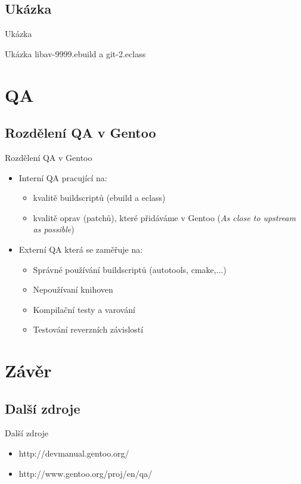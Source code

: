 \documentclass{beamer}
\begin{document}
\subsection{Ukázka}
\begin{frame}{Ukázka}
	\begin{center}Ukázka libav-9999.ebuild a git-2.eclass\end{center}
\end{frame}
\section{QA}

\subsection{Rozdělení QA v Gentoo}
\begin{frame}{Rozdělení QA v Gentoo}
	\begin{itemize}
	\item Interní QA pracující na:
		\begin{itemize}
			\item kvalitě buildscriptů (ebuild a eclass)
			\item kvalitě oprav (patchů), které přidáváme v Gentoo ({\it As close to upstream as possible})
		\end{itemize}
	\item Externí QA která se zaměřuje na:
		\begin{itemize}
			\item Správné používání buildscriptů (autotools, cmake,...)
			\item Nepoužívaní  knihoven
			\item Kompilační testy a varování
			\item Testování reverzních závislostí
		\end{itemize}
	\end{itemize}
\end{frame}

\section{Závěr}
\subsection{Další zdroje}
\begin{frame}{Další zdroje}
	\begin{itemize}
		\item http://devmanual.gentoo.org/
		\item http://www.gentoo.org/proj/en/qa/
	\end{itemize}
\end{frame}
\end{document}
